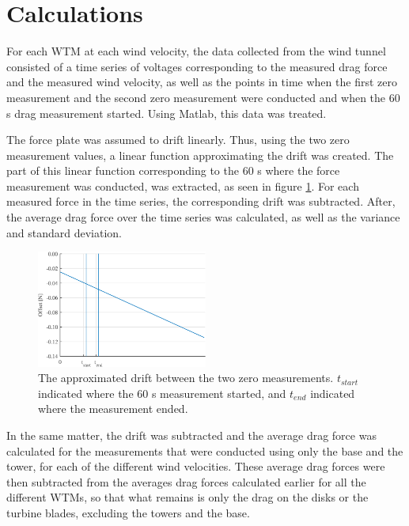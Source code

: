 \section{Calculations}

For each \gls{WTM} at each wind velocity, the data collected from the wind tunnel consisted of a time series of voltages corresponding to the measured drag force and the measured wind velocity, as well as the points in time when the first zero measurement and the second zero measurement were conducted and when the 60 \si{\s} drag measurement started. Using Matlab, this data was treated.

The force plate was assumed to drift linearly. Thus, using the two zero measurement values, a linear function approximating the drift was created. The part of this linear function corresponding to the 60 \si{\s} where the force measurement was conducted, was extracted, as seen in figure \ref{Fig:driftAdjust}. For each measured force in the time series, the corresponding drift was subtracted. After, the average drag force over the time series was calculated, as well as the variance and standard deviation. 

\begin{figure}
    \centering
    \includegraphics[width=0.5\textwidth]{0_Images/DriftDown.eps}    
    \caption{The approximated drift between the two zero measurements. $t_{start}$ indicated where the 60 \si{s} measurement started, and $t_{end}$ indicated where the measurement ended.}
    \label{Fig:driftAdjust}
\end{figure}

In the same matter, the drift was subtracted and the average drag force was calculated for the measurements that were conducted using only the base and the tower, for each of the different wind velocities. These average drag forces were then subtracted from the averages drag forces calculated earlier for all the different \gls{WTM}s, so that what remains is only the drag on the disks or the turbine blades, excluding the towers and the base. 


